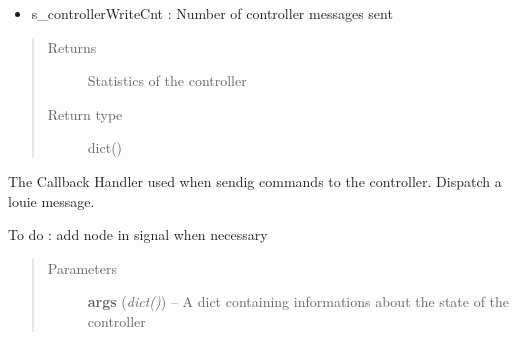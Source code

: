 \documentclass[letterpaper,10pt,english]{sphinxmanual}
\begin{document}
\begin{fulllineitems}
\begin{fulllineitems}
\begin{itemize}
\item {} 
s\_controllerWriteCnt             : Number of controller messages sent

\end{itemize}
\begin{quote}\begin{description}
\item[{Returns}] \leavevmode
Statistics of the controller

\item[{Return type}] \leavevmode
dict()

\end{description}\end{quote}

\end{fulllineitems}


\begin{fulllineitems}
\label{controller:openzwave.controller.ZWaveController.zwcallback}
The Callback Handler used when sendig commands to the controller.
Dispatch a louie message.

To do : add node in signal when necessary
\begin{quote}\begin{description}
\item[{Parameters}] \leavevmode
\textbf{args} (\emph{dict()}) -- A dict containing informations about the state of the controller

\end{description}\end{quote}

\end{fulllineitems}


\end{fulllineitems}
\end{document}

